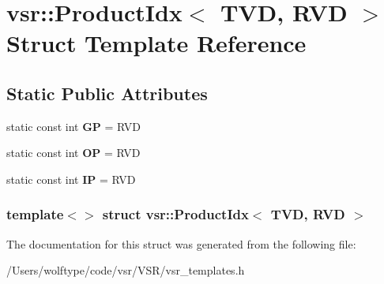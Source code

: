 \hypertarget{structvsr_1_1_product_idx_3_01_t_v_d_00_01_r_v_d_01_4}{\section{vsr\-:\-:Product\-Idx$<$ T\-V\-D, R\-V\-D $>$ Struct Template Reference}
\label{structvsr_1_1_product_idx_3_01_t_v_d_00_01_r_v_d_01_4}
}
\subsection*{Static Public Attributes}
\begin{DoxyCompactItemize}
\item 
\hypertarget{structvsr_1_1_product_idx_3_01_t_v_d_00_01_r_v_d_01_4_a158e3550b9f0ca21070e6f205c1381fe}{static const int {\bfseries G\-P} = R\-V\-D}\label{structvsr_1_1_product_idx_3_01_t_v_d_00_01_r_v_d_01_4_a158e3550b9f0ca21070e6f205c1381fe}

\item 
\hypertarget{structvsr_1_1_product_idx_3_01_t_v_d_00_01_r_v_d_01_4_aeaf87cb4c3d5b889300a404bc1cba32e}{static const int {\bfseries O\-P} = R\-V\-D}\label{structvsr_1_1_product_idx_3_01_t_v_d_00_01_r_v_d_01_4_aeaf87cb4c3d5b889300a404bc1cba32e}

\item 
\hypertarget{structvsr_1_1_product_idx_3_01_t_v_d_00_01_r_v_d_01_4_a8c529954a090591ce1c2b0be7dae9714}{static const int {\bfseries I\-P} = R\-V\-D}\label{structvsr_1_1_product_idx_3_01_t_v_d_00_01_r_v_d_01_4_a8c529954a090591ce1c2b0be7dae9714}

\end{DoxyCompactItemize}
\subsubsection*{template$<$$>$ struct vsr\-::\-Product\-Idx$<$ T\-V\-D, R\-V\-D $>$}



The documentation for this struct was generated from the following file\-:\begin{DoxyCompactItemize}
\item 
/\-Users/wolftype/code/vsr/\-V\-S\-R/vsr\-\_\-templates.\-h\end{DoxyCompactItemize}
